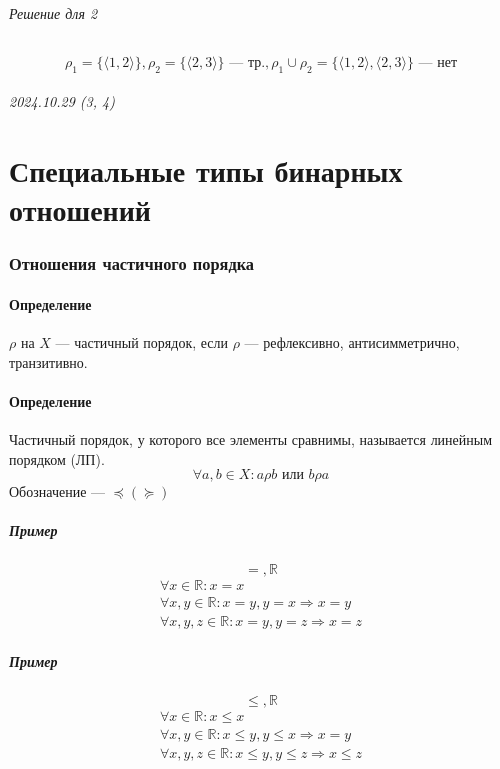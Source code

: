 \documentclass{article}
\begin{document}
\paragraph{Решение для 2}
\[
    \rho_1 = \{\langle 1, 2 \rangle\}, \rho_2 = \{\langle 2, 3 \rangle\} \text{ --- тр.}, \rho_1 \cup \rho_2 = \{\langle 1, 2 \rangle, \langle 2, 3 \rangle\} \text{ --- нет}
\]




\newpage
\paragraph{2024.10.29 (3, 4)}
\part{Специальные типы бинарных отношений}

\section{Отношения частичного порядка}

\subsection{Определение}
$\rho$ на $X$ --- частичный порядок, если $\rho$ --- рефлексивно, антисимметрично, транзитивно.


\subsection{Определение}
Частичный порядок, у которого все элементы сравнимы, называется линейным порядком (ЛП).
\[
    \forall a, b \in X: a \rho b \text{ или } b \rho a
\]
Обозначение --- $\preccurlyeq (\succcurlyeq)$

\subsubsection{Пример}
\[
    =, \mathbb{R}
\]
\begin{gather*}
    \forall x \in \mathbb{R}: x = x \\
    \forall x, y \in \mathbb{R}: x = y, y = x \Rightarrow x = y \\
    \forall x, y, z \in \mathbb{R}: x = y, y = z \Rightarrow x = z
\end{gather*}

\subsubsection{Пример}
\[
    \le, \mathbb{R}
\]
\begin{gather*}
    \forall x \in \mathbb{R}: x \le x \\
    \forall x, y \in \mathbb{R}: x \le y, y \le x \Rightarrow x = y \\
    \forall x, y, z \in \mathbb{R}: x \le y, y \le z \Rightarrow x \le z
\end{gather*}
\end{document}
